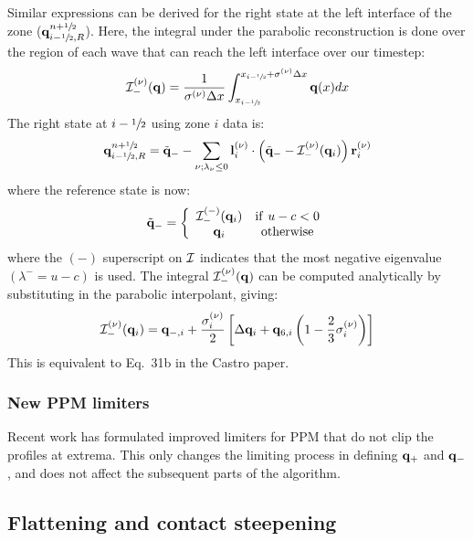 Similar expressions can be derived for the right state at the left interface
of the zone (${\bf q}_{i-{\sfrac{1}{2}},R}^{n+{\sfrac{1}{2}}}$).  Here, the integral under the parabolic
reconstruction is done over the region of each wave that can reach the left
interface over our timestep:
\begin{equation}
{\mathcal{I}}_-^{(\nu)}({\bf q}) = \frac{1}{\sigma^{(\nu)} \Delta x}
  \int_{x_{i-{\sfrac{1}{2}}}}^{x_{i-{\sfrac{1}{2}}} + \sigma^{(\nu)} \Delta x} {\bf q}(x) dx
\end{equation}
The right state at $i-{\sfrac{1}{2}}$ using zone $i$ data is:
\begin{equation}
{\bf q}_{i-{\sfrac{1}{2}},R}^{n+{\sfrac{1}{2}}} = \tilde{{\bf q}}_- - \sum_{\nu; \lambda_\nu \le 0}
   {\bf l}_i^{(\nu)} \cdot \left ( \tilde{{\bf q}}_- - {\mathcal{I}}_-^{(\nu)}({\bf q}_i) \right ) {\bf r}_i^{(\nu)}
\end{equation}
where the reference state is now:
\begin{equation}
\tilde{{\bf q}}_- = \left \{ \begin{array}{cc}
   {\mathcal{I}}_-^{(-)}({\bf q}_i) & \mathrm{if~} u - c < 0 \\
    {\bf q}_i                   & \mathrm{otherwise}
\end{array} \right .
\end{equation}
where the $(-)$ superscript on ${\mathcal{I}}$ indicates that the most
negative eigenvalue $(\lambda^- = u - c)$ is used.  The integral
${\mathcal{I}}_-^{(\nu)}({\bf q})$ can be computed analytically by
substituting in the parabolic interpolant, giving:
\begin{equation}
{\mathcal{I}}_-^{(\nu)}({\bf q}_i) = {\bf q}_{-,i} + \frac{\sigma_i^{(\nu)}}{2}
   \left [ \Delta {\bf q}_i + {\bf q}_{6,i} \left ( 1 - \frac{2}{3} \sigma_i^{(\nu)} \right ) \right ]
\end{equation}
This is equivalent to Eq.~31b in the Castro paper.

\subsubsection{New PPM limiters}

Recent work \cite{colellasekora} has formulated improved limiters for
PPM that do not clip the profiles at extrema.  This only changes the
limiting process in defining ${\bf q}_+$ and ${\bf q}_-$, and does not affect the
subsequent parts of the algorithm.


\subsection{Flattening and contact steepening}

